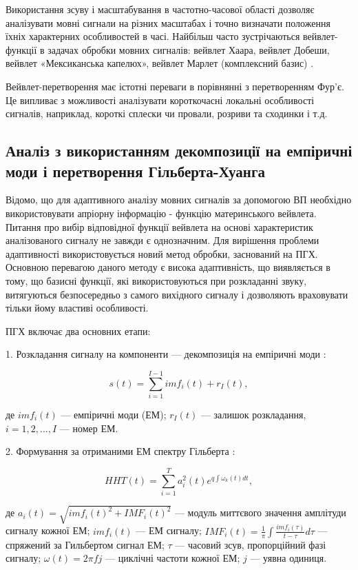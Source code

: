 Використання зсуву і масштабування в частотно-часової області дозволяє аналізувати мовні сигнали на різних масштабах і точно визначати положення їхніх характерних особливостей в часі. Найбільш часто зустрічаються вейвлет-функції в задачах обробки мовних сигналів: вейвлет Хаара, вейвлет Добеши, вейвлет «Мексиканська капелюх», вейвлет Марлет (комплексний базис) \cite{Майдан_2007}.

Вейвлет-перетворення має істотні переваги в порівнянні з перетворенням Фур'є. Це випливає з можливості аналізувати короткочасні локальні особливості сигналів, наприклад, короткі сплески чи провали, розриви та сходинки і т.д.

\subsection{Аналіз з використанням декомпозиції на емпіричні моди і перетворення Гільберта-Хуанга}

Відомо, що для адаптивного аналізу мовних сигналів за допомогою ВП необхідно використовувати апріорну інформацію - функцію материнського вейвлета. Питання про вибір відповідної функції вейвлета на основі характеристик аналізованого сигналу не завжди є однозначним. Для вирішення проблеми адаптивності використовується новий метод обробки, заснований на ПГХ. Основною перевагою даного методу є висока адаптивність, що виявляється в тому, що базисні функції, які використовуються при розкладанні звуку, витягуються безпосередньо з самого вихідного сигналу і дозволяють враховувати тільки йому властиві особливості.

ПГХ включає два основних етапи:

1. Розкладання сигналу на компоненти --- декомпозиція на емпіричні моди \cite{Huang_1998,Tychkov_2013}:

\begin{equation}
\label{eq:equation5}
s(t)=\sum_{i=1}^{I-1}imf_i(t)+r_I(t),
\end{equation}

\noindent
де $imf_i(t)$ --- емпіричні моди (ЕМ); $r_I(t)$ --- залишок розкладання, $i=1,2,...,I$ --- номер ЕМ.

2. Формування за отриманими ЕМ спектру Гільберта \cite{Huang_2013}:

\begin{equation}
\label{eq:equation6}
HHT(t)=\sum_{i=1}^{T}a_i^2(t)e^{q\int\omega_k(t)dt},
\end{equation}

\noindent
де $a_i(t)=\sqrt{imf_i(t)^2+IMF_i(t)^2}$ --- модуль миттєвого значення амплітуди сигналу кожної ЕМ; $imf_i(t)$ --- ЕМ сигналу; $IMF_i(t)=\frac{1}{\pi}\int\frac{imf_i(\tau)}{t-\tau}d\tau$ --- спряжений за Гильбертом сигнал ЕМ; $\tau$ --- часовий зсув, пропорційний фазі сигналу; $\omega(t)=2\pi fj$ --- циклічні частоти кожної ЕМ; $j$ --- уявна одиниця.

